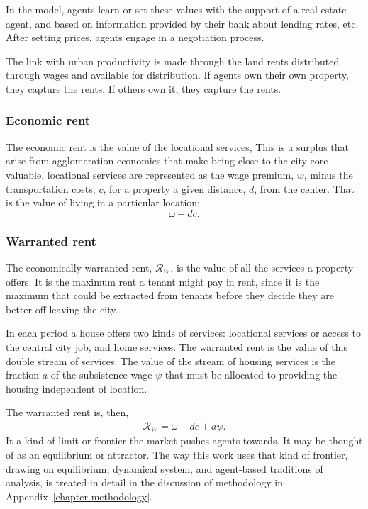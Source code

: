 In the model, agents learn or set these values with the support of a real estate agent, and based on information provided by their bank about lending rates, etc. After setting prices, agents engage in a negotiation process. 

The link with urban productivity is made through the land rents distributed through wages and available for distribution. If agents own their own property, they capture the rents. If others own it, they capture the rents.


\subsubsection{Economic rent} \label{section-economic-rent}
The economic rent is the value of the locational services, 
This is a surplus that arise from agglomeration economies that make being close to the city core valuable. \Gls{locational services} are represented as %
the wage premium, $w$, minus the transportation costs, $c$, for a property a given distance, $d$, from the center. That is the value of living in a particular location:
\[\omega- {dc}.\]


\subsubsection{Warranted rent} \label{section-waranted-rent}

The economically \gls{warranted rent}, $\mathcal{R}_W$, is the value of all  the services a property offers. %
It is the maximum rent  a tenant might pay in rent, since it is the maximum that could be extracted from tenants before they decide they are better off leaving the city.  

In each period a house offers two kinds of services: {locational services} or  access to the central city job, and {home services}.  The {warranted rent} is the value of this double stream of services.  The value of the stream of housing services is the fraction $a$ of the subsistence wage $\psi$ that must be allocated to providing the housing independent of location. 

 The warranted rent is, then, 
\begin{align}
\mathcal{R}_W=\omega- {dc} + a\psi.
\label{eqn-warranted-rent}
\end{align}
 It a kind of limit or \gls{frontier} the market pushes agents towards. It may be thought of as an \gls{equilibrium} or \gls{attractor}. The way this work uses that kind of frontier, drawing on \gls{equilibrium}, \gls{dynamical system}, and \gls{agent-based} traditions of analysis, is treated in detail in the discussion of methodology in Appendix~\ref{chapter-methodology}.

